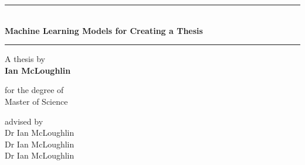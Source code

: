 
\newcommand{\thesistitle}{Machine Learning Models for Creating a Thesis}
\newcommand{\thesisauthor}{Ian McLoughlin}
\newcommand{\thesisadvisor}{Dr Ian McLoughlin \\ Dr Ian McLoughlin \\ Dr Ian McLoughlin}
\newcommand{\thesisdegree}{Master of Science}
\newcommand{\thesisdate}{\today}
\newcommand{\thesisinstitute}{Galway-Mayo Institute of Technology}
\newcommand{\thesisdepartment}{Department of Computer Science and Applied Physics}


\begin{titlingpage}
  
  \begin{center}
    \begin{minipage}{\textwidth}
      \centering
      \rule{\linewidth}{0.2mm} \\[6mm]
      { \LARGE \bfseries \thesistitle } \\[2mm]
      \rule{\linewidth}{0.2mm}
    \end{minipage}
  \end{center}

  \vspace{16mm}

  \begin{center}
    \begin{minipage}[t]{\textwidth}
      \centering
      {\small A thesis by} \\
      {\large \textbf{\thesisauthor}}
    \end{minipage}
  \end{center}

  \vspace{20mm}

  \begin{center}
    \begin{minipage}[t]{\textwidth}
      \centering
      {\small for the degree of} \\
      {\large \thesisdegree}
    \end{minipage}
  \end{center}
  
  \vspace{2mm}
  
  \begin{center}
    \begin{minipage}[t]{\textwidth}
      \centering
      {\small advised by} \\
      \thesisadvisor
    \end{minipage}
  \end{center}


\end{titlingpage}
